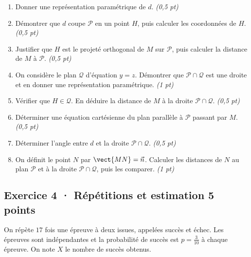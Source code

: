 \begin{enumerate}

\item Donner une représentation paramétrique de $d$. \hfill\textit{(0,5 pt)}

\item Démontrer que $d$ coupe $\mathcal P$ en un point $H$, puis calculer les coordonnées de $H$. \hfill\textit{(0,5 pt)}

\item Justifier que $H$ est le projeté orthogonal de $M$ sur $\mathcal P$, puis calculer la distance de $M$ à $\mathcal P$. \hfill\textit{(0,5 pt)}

\item On considère le plan $\mathcal Q$ d'équation $y=z$. Démontrer que $\mathcal P\cap\mathcal Q$ est une droite et en donner une représentation paramétrique. \hfill\textit{(1 pt)}

\item Vérifier que $H\in\mathcal Q$. En déduire la distance de $M$ à la droite $\mathcal P\cap\mathcal Q$. \hfill\textit{(0,5 pt)}

\item Déterminer une équation cartésienne du plan parallèle à $\mathcal P$ passant par $M$. \hfill\textit{(0,5 pt)}

\item Déterminer l'angle entre $d$ et la droite $\mathcal P\cap\mathcal Q$. \hfill\textit{(0,5 pt)}

\item On définit le point $N$ par $\vect{MN}=\vec n$. Calculer les distances de $N$ au plan $\mathcal P$ et à la droite $\mathcal P\cap\mathcal Q$, puis les comparer. \hfill\textit{(1 pt)}

\end{enumerate}

\subsection*{Exercice 4 · Répétitions et estimation \hfill 5 points}On répète $17$ fois une épreuve à deux issues, appelées succès et échec. Les épreuves sont indépendantes et la probabilité de succès est $p=\frac{3}{10}$ à chaque épreuve. On note $X$ le nombre de succès obtenus.

